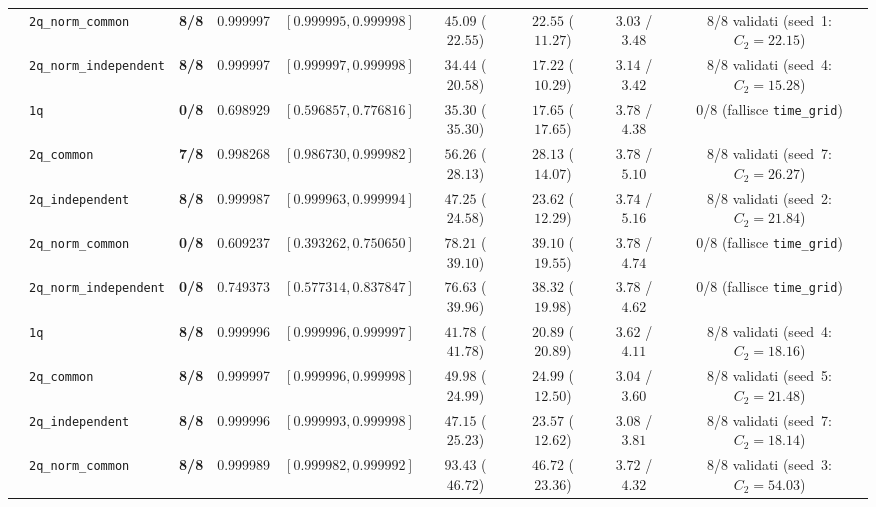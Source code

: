 \documentclass[11pt,a4paper]{article}
\begin{document}
\begin{table}[H]
{\begin{tabular}{llccccccc}
 & \texttt{2q\_norm\_common} & \textbf{8/8} & 0.999997 & $[0.999995, 0.999998]$ & $45.09$ ($22.55$) & $22.55$ ($11.27$) & $3.03$ / $3.48$ & 8/8 validati (seed~1: $C_2=22.15$) \\
 & \texttt{2q\_norm\_independent} & \textbf{8/8} & 0.999997 & $[0.999997, 0.999998]$ & $34.44$ ($20.58$) & $17.22$ ($10.29$) & $3.14$ / $3.42$ & 8/8 validati (seed~4: $C_2=15.28$) \\
\midrule
{}
 & \texttt{1q} & \textbf{0/8} & 0.698929 & $[0.596857, 0.776816]$ & $35.30$ ($35.30$) & $17.65$ ($17.65$) & $3.78$ / $4.38$ & 0/8 (fallisce \texttt{time\_grid}) \\
 & \texttt{2q\_common} & \textbf{7/8} & 0.998268 & $[0.986730, 0.999982]$ & $56.26$ ($28.13$) & $28.13$ ($14.07$) & $3.78$ / $5.10$ & 8/8 validati (seed~7: $C_2=26.27$) \\
 & \texttt{2q\_independent} & \textbf{8/8} & 0.999987 & $[0.999963, 0.999994]$ & $47.25$ ($24.58$) & $23.62$ ($12.29$) & $3.74$ / $5.16$ & 8/8 validati (seed~2: $C_2=21.84$) \\
 & \texttt{2q\_norm\_common} & \textbf{0/8} & 0.609237 & $[0.393262, 0.750650]$ & $78.21$ ($39.10$) & $39.10$ ($19.55$) & $3.78$ / $4.74$ & 0/8 (fallisce \texttt{time\_grid}) \\
 & \texttt{2q\_norm\_independent} & \textbf{0/8} & 0.749373 & $[0.577314, 0.837847]$ & $76.63$ ($39.96$) & $38.32$ ($19.98$) & $3.78$ / $4.62$ & 0/8 (fallisce \texttt{time\_grid}) \\
\midrule
{}
 & \texttt{1q} & \textbf{8/8} & 0.999996 & $[0.999996, 0.999997]$ & $41.78$ ($41.78$) & $20.89$ ($20.89$) & $3.62$ / $4.11$ & 8/8 validati (seed~4: $C_2=18.16$) \\
 & \texttt{2q\_common} & \textbf{8/8} & 0.999997 & $[0.999996, 0.999998]$ & $49.98$ ($24.99$) & $24.99$ ($12.50$) & $3.04$ / $3.60$ & 8/8 validati (seed~5: $C_2=21.48$) \\
 & \texttt{2q\_independent} & \textbf{8/8} & 0.999996 & $[0.999993, 0.999998]$ & $47.15$ ($25.23$) & $23.57$ ($12.62$) & $3.08$ / $3.81$ & 8/8 validati (seed~7: $C_2=18.14$) \\
 & \texttt{2q\_norm\_common} & \textbf{8/8} & 0.999989 & $[0.999982, 0.999992]$ & $93.43$ ($46.72$) & $46.72$ ($23.36$) & $3.72$ / $4.32$ & 8/8 validati (seed~3: $C_2=54.03$) \\

\end{tabular}}
\end{table}
\end{document}
